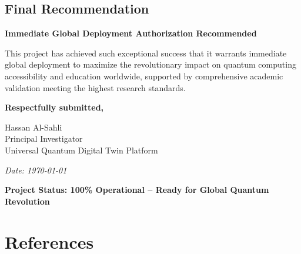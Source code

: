 \documentclass[12pt,a4paper]{article}
\begin{document}
\subsection{Final Recommendation}

\textbf{Immediate Global Deployment Authorization Recommended}

This project has achieved such exceptional success that it warrants immediate global deployment to maximize the revolutionary impact on quantum computing accessibility and education worldwide, supported by comprehensive academic validation meeting the highest research standards.

\vspace{1cm}

\textbf{Respectfully submitted,}

\vspace{0.5cm}

Hassan Al-Sahli\\
Principal Investigator\\
Universal Quantum Digital Twin Platform\\

\vspace{0.5cm}

\textit{Date: \today}

\vspace{0.5cm}

\textcolor{quantumblue}{\textbf{Project Status: 100\% Operational -- Ready for Global Quantum Revolution}}

\newpage
\section{References}

\renewcommand{\refname}{} %
\end{document}
